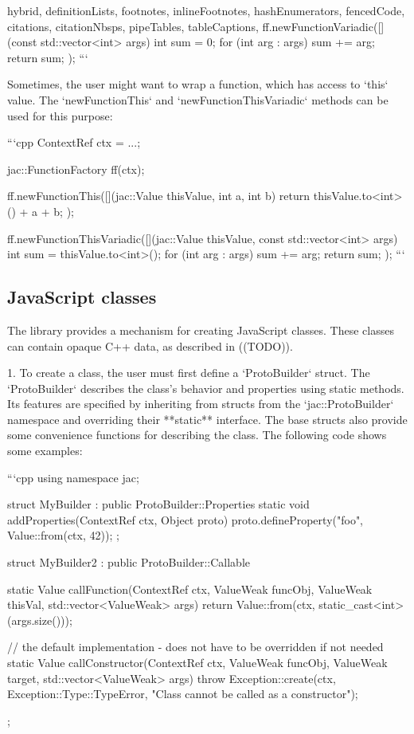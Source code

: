 \documentclass[
  digital,
  oneside,
  nosansbold,
  nocolorbold,
  lof,
  lot
]{fithesis4}
\begin{document}
\begin{markdown*}{%
  hybrid,
  definitionLists,
  footnotes,
  inlineFootnotes,
  hashEnumerators,
  fencedCode,
  citations,
  citationNbsps,
  pipeTables,
  tableCaptions,
}
ff.newFunctionVariadic([](const std::vector<int> args) {
    int sum = 0;
    for (int arg : args) {
        sum += arg;
    }
    return sum;
});
```

Sometimes, the user might want to wrap a function, which has access to `this` value. The `newFunctionThis` and `newFunctionThisVariadic` methods can be used for this purpose:

```cpp
ContextRef ctx = ...;

jac::FunctionFactory ff(ctx);

ff.newFunctionThis([](jac::Value thisValue, int a, int b) {
    return thisValue.to<int>() + a + b;
});

ff.newFunctionThisVariadic([](jac::Value thisValue, const std::vector<int> args) {
    int sum = thisValue.to<int>();
    for (int arg : args) {
        sum += arg;
    }
    return sum;
});
```

\subsection{JavaScript classes}

The library provides a mechanism for creating JavaScript classes. These classes can contain opaque C++ data, as described in ((TODO)).

  1. To create a class, the user must first define a `ProtoBuilder` struct. The `ProtoBuilder` describes the class's behavior and properties using static methods. Its features are specified by inheriting from structs from the `jac::ProtoBuilder` namespace and overriding their **static** interface. The base structs also provide some convenience functions for describing the class. The following code shows some examples:

```cpp
using namespace jac;

struct MyBuilder : public ProtoBuilder::Properties {
    static void addProperties(ContextRef ctx, Object proto) {
        proto.defineProperty("foo", Value::from(ctx, 42));
    }
};

struct MyBuilder2 : public ProtoBuilder::Callable {
    static Value callFunction(ContextRef ctx, ValueWeak funcObj, ValueWeak thisVal, std::vector<ValueWeak> args) {
        return Value::from(ctx, static_cast<int>(args.size()));
    }

    // the default implementation - does not have to be overridden if not needed
    static Value callConstructor(ContextRef ctx, ValueWeak funcObj, ValueWeak target, std::vector<ValueWeak> args) {
        throw Exception::create(ctx, Exception::Type::TypeError, "Class cannot be called as a constructor");
    }
};


\end{markdown*}
\end{document}
